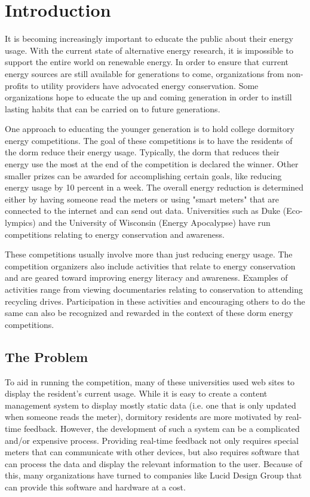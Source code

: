 
\chapter{Introduction}
It is becoming increasingly important to educate the public about their energy usage.  With the current state of alternative energy research, it is impossible to support the entire world on renewable energy.  In order to ensure that current energy sources are still available for generations to come, organizations from non-profits to utility providers have advocated energy conservation.  Some organizations hope to educate the up and coming generation in order to instill lasting habits that can be carried on to future generations.

One approach to educating the younger generation is to hold college dormitory energy competitions.  The goal of these competitions is to have the residents of the dorm reduce their energy usage.  Typically, the dorm that reduces their energy use the most at the end of the competition is declared the winner.  Other smaller prizes can be awarded for accomplishing certain goals, like reducing energy usage by 10 percent in a week.  The overall energy reduction is determined either by having someone read the meters or using "smart meters" that are connected to the internet and can send out data.  Universities such as Duke (Eco-lympics) and the University of Wisconsin (Energy Apocalypse) have run competitions relating to energy conservation and awareness. 

These competitions usually involve more than just reducing energy usage.  The competition organizers also include activities that relate to energy conservation and are geared toward improving energy literacy and awareness.  Examples of activities range from viewing documentaries relating to conservation to attending recycling drives.  Participation in these activities and encouraging others to do the same can also be recognized and rewarded in the context of these dorm energy competitions.

\section{The Problem}

To aid in running the competition, many of these universities used web sites to display the resident's current usage.  While it is easy to create a content management system to display mostly static data (i.e. one that is only updated when someone reads the meter), dormitory residents are more motivated by real-time feedback\cite{oberlin-feedback}.  However, the development of such a system can be a complicated and/or expensive process.  Providing real-time feedback not only requires special meters that can communicate with other devices, but also requires software that can process the data and display the relevant information to the user.  Because of this, many organizations have turned to companies like Lucid Design Group that can provide this software and hardware at a cost.

